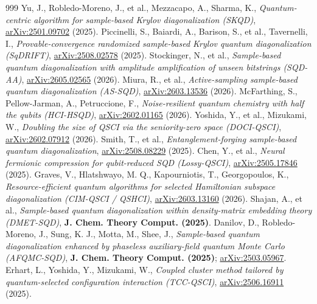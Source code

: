 \documentclass[11pt]{article}
\begin{document}
\begin{thebibliography}{999}
 Yu, J., Robledo-Moreno, J., et al., Mezzacapo, A., Sharma, K., \emph{Quantum-centric algorithm for sample-based Krylov diagonalization (SKQD)}, \href{https://arxiv.org/abs/2501.09702}{arXiv:2501.09702} (2025).
 Piccinelli, S., Baiardi, A., Barison, S., et al., Tavernelli, I., \emph{Provable-convergence randomized sample-based Krylov quantum diagonalization (SqDRIFT)}, \href{https://arxiv.org/abs/2508.02578}{arXiv:2508.02578} (2025).
 Stockinger, N., et al., \emph{Sample-based quantum diagonalization with amplitude amplification of unseen bitstrings (SQD-AA)}, \href{https://arxiv.org/abs/2605.02565}{arXiv:2605.02565} (2026).
 Miura, R., et al., \emph{Active-sampling sample-based quantum diagonalization (AS-SQD)}, \href{https://arxiv.org/abs/2603.13536}{arXiv:2603.13536} (2026).
 McFarthing, S., Pellow-Jarman, A., Petruccione, F., \emph{Noise-resilient quantum chemistry with half the qubits (HCI-HSQD)}, \href{https://arxiv.org/abs/2602.01165}{arXiv:2602.01165} (2026).
 Yoshida, Y., et al., Mizukami, W., \emph{Doubling the size of QSCI via the seniority-zero space (DOCI-QSCI)}, \href{https://arxiv.org/abs/2602.07912}{arXiv:2602.07912} (2026).
 Smith, T., et al., \emph{Entanglement-forging sample-based quantum diagonalization}, \href{https://arxiv.org/abs/2508.08229}{arXiv:2508.08229} (2025).
 Chen, Y., et al., \emph{Neural fermionic compression for qubit-reduced SQD (Lossy-QSCI)}, \href{https://arxiv.org/abs/2505.17846}{arXiv:2505.17846} (2025).
 Graves, V., Hlatshwayo, M. Q., Kapourniotis, T., Georgopoulos, K., \emph{Resource-efficient quantum algorithms for selected Hamiltonian subspace diagonalization (CIM-QSCI / QSHCI)}, \href{https://arxiv.org/abs/2603.13160}{arXiv:2603.13160} (2026).
 Shajan, A., et al., \emph{Sample-based quantum diagonalization within density-matrix embedding theory (DMET-SQD)}, \textbf{J. Chem. Theory Comput. (2025)}.
 Danilov, D., Robledo-Moreno, J., Sung, K. J., Motta, M., Shee, J., \emph{Sample-based quantum diagonalization enhanced by phaseless auxiliary-field quantum Monte Carlo (AFQMC-SQD)}, \textbf{J. Chem. Theory Comput. (2025)}; \href{https://arxiv.org/abs/2503.05967}{arXiv:2503.05967}.
 Erhart, L., Yoshida, Y., Mizukami, W., \emph{Coupled cluster method tailored by quantum-selected configuration interaction (TCC-QSCI)}, \href{https://arxiv.org/abs/2506.16911}{arXiv:2506.16911} (2025).

\end{thebibliography}
\end{document}
